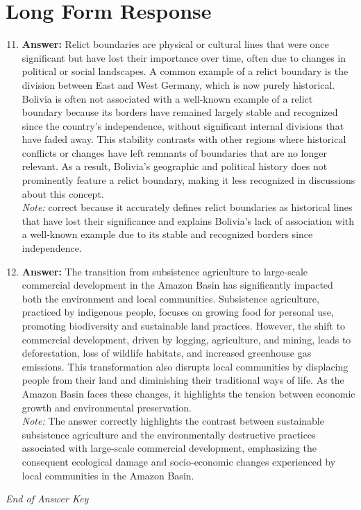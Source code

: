 \documentclass[12pt]{article}
\begin{document}
\section*{Long Form Response}
\begin{enumerate}[label=\arabic*.]
\setcounter{enumi}{10}
\item \textbf{Answer:} Relict boundaries are physical or cultural lines that were once significant but have lost their importance over time, often due to changes in political or social landscapes. A common example of a relict boundary is the division between East and West Germany, which is now purely historical. Bolivia is often not associated with a well-known example of a relict boundary because its borders have remained largely stable and recognized since the country's independence, without significant internal divisions that have faded away. This stability contrasts with other regions where historical conflicts or changes have left remnants of boundaries that are no longer relevant. As a result, Bolivia's geographic and political history does not prominently feature a relict boundary, making it less recognized in discussions about this concept.
\\ \textit{Note:} correct because it accurately defines relict boundaries as historical lines that have lost their significance and explains Bolivia's lack of association with a well-known example due to its stable and recognized borders since independence.
\item \textbf{Answer:} The transition from subsistence agriculture to large-scale commercial development in the Amazon Basin has significantly impacted both the environment and local communities. Subsistence agriculture, practiced by indigenous people, focuses on growing food for personal use, promoting biodiversity and sustainable land practices. However, the shift to commercial development, driven by logging, agriculture, and mining, leads to deforestation, loss of wildlife habitats, and increased greenhouse gas emissions. This transformation also disrupts local communities by displacing people from their land and diminishing their traditional ways of life. As the Amazon Basin faces these changes, it highlights the tension between economic growth and environmental preservation.
\\ \textit{Note:} The answer correctly highlights the contrast between sustainable subsistence agriculture and the environmentally destructive practices associated with large-scale commercial development, emphasizing the consequent ecological damage and socio-economic changes experienced by local communities in the Amazon Basin.
\end{enumerate}

\vfill
\noindent\textit{End of Answer Key}
\end{document}
